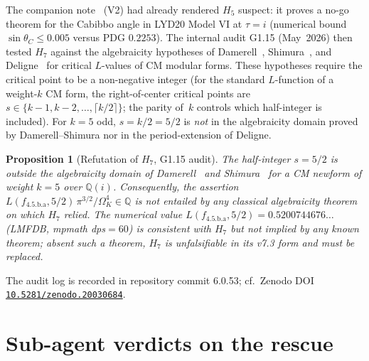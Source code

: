 \documentclass[a4paper,11pt]{article}
\newcommand{\OmK}{\Omega_K}
\newcommand{\fLM}{f_{\text{4.5.b.a}}}
\newcommand{\Qi}{\mathbb{Q}(i)}
\newcommand{\Zeno}{\href{https://doi.org/10.5281/zenodo.20030684}{\texttt{10.5281/zenodo.20030684}}}
\newtheorem{proposition}[theorem]{Proposition}
\theoremstyle{definition}
\theoremstyle{remark}
\begin{document}
The companion note~\cite{V2NoGo} (V2) had already rendered $H_5$
suspect: it proves a no-go theorem for the Cabibbo angle in LYD20
Model VI at $\tau=i$ (numerical bound $\sin\theta_C \le 0.005$ versus
PDG $0.2253$).  The internal audit G1.15 (May~2026) then tested $H_7$
against the algebraicity hypotheses of Damerell~\cite{Damerell71},
Shimura~\cite{Shimura76}, and Deligne~\cite{Deligne79} for critical
$L$-values of CM modular forms.  These hypotheses require the critical
point to be a non-negative integer (for the standard $L$-function of a
weight-$k$ CM form, the right-of-center critical points are
$s\in\{k-1, k-2,\ldots, \lceil k/2\rceil\}$; the parity of~$k$
controls which half-integer is included).  For $k=5$ odd, $s=k/2=5/2$
is \emph{not} in the algebraicity domain proved by Damerell--Shimura
nor in the period-extension of Deligne.

\begin{proposition}[Refutation of $H_7$, G1.15 audit]
\label{prop:refute}
The half-integer $s=5/2$ is outside the algebraicity domain of
Damerell~\cite{Damerell71} and Shimura~\cite{Shimura76} for a CM
newform of weight $k=5$ over $\Qi$.  Consequently, the assertion
$L(\fLM, 5/2)\,\pi^{3/2}/\OmK^{4}\in\mathbb{Q}$ is not entailed by
any classical algebraicity theorem on which $H_7$ relied.
The numerical value $L(\fLM, 5/2) = 0.5200744676\ldots$ (LMFDB,
mpmath dps$=60$) is consistent with $H_7$ but not implied by any
known theorem; absent such a theorem, $H_7$ is unfalsifiable in its
v7.3 form and must be replaced.
\end{proposition}

\noindent
The audit log is recorded in repository commit 6.0.53; cf.\ Zenodo
DOI \Zeno.

\section{Sub-agent verdicts on the rescue}
\label{sec:rescue}
\end{document}
